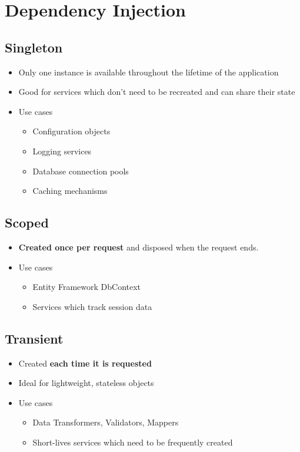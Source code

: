 \chapter{Dependency Injection}

\section{Singleton}
	\begin{itemize}
		\item Only one instance is available throughout the lifetime of the application
		\item Good for services which don't need to be recreated and can share their state
		\item Use cases
		\begin{itemize}
			\item Configuration objects
			\item Logging services
			\item Database connection pools
			\item Caching mechanisms
		\end{itemize}
	\end{itemize}
\section{Scoped}
	\begin{itemize}
		\item \textbf{Created once per request} and disposed when the request ends.
		\item Use cases
		\begin{itemize}
			\item Entity Framework DbContext
			\item Services which track session data
		\end{itemize}
	\end{itemize}
\section{Transient}
	\begin{itemize}
		\item Created \textbf{each time it is requested}
		\item Ideal for lightweight, stateless objects
		\item Use cases
		\begin{itemize}
			\item Data Transformers, Validators, Mappers
			\item Short-lives services which need to be frequently created
		\end{itemize}
	\end{itemize}